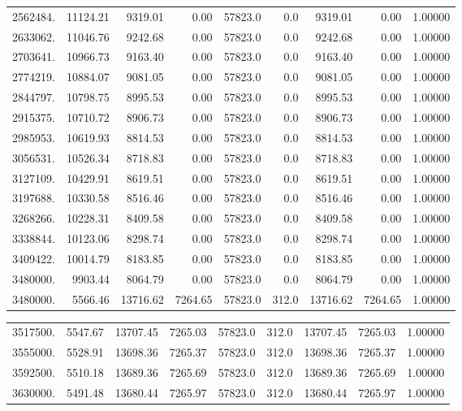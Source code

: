 {\begin{tabular}{rrrrrrrrr}
2562484.& 11124.21 & 9319.01    & 0.00 & 57823.0     & 0.0 & 9319.01    & 0.00 & 1.00000 \\
2633062.& 11046.76 & 9242.68    & 0.00 & 57823.0     & 0.0 & 9242.68    & 0.00 & 1.00000 \\
2703641.& 10966.73 & 9163.40    & 0.00 & 57823.0     & 0.0 & 9163.40    & 0.00 & 1.00000 \\
2774219.& 10884.07 & 9081.05    & 0.00 & 57823.0     & 0.0 & 9081.05    & 0.00 & 1.00000 \\
2844797.& 10798.75 & 8995.53    & 0.00 & 57823.0     & 0.0 & 8995.53    & 0.00 & 1.00000 \\
2915375.& 10710.72 & 8906.73    & 0.00 & 57823.0     & 0.0 & 8906.73    & 0.00 & 1.00000 \\
2985953.& 10619.93 & 8814.53    & 0.00 & 57823.0     & 0.0 & 8814.53    & 0.00 & 1.00000 \\
3056531.& 10526.34 & 8718.83    & 0.00 & 57823.0     & 0.0 & 8718.83    & 0.00 & 1.00000 \\
3127109.& 10429.91 & 8619.51    & 0.00 & 57823.0     & 0.0 & 8619.51    & 0.00 & 1.00000 \\
3197688.& 10330.58 & 8516.46    & 0.00 & 57823.0     & 0.0 & 8516.46    & 0.00 & 1.00000 \\
3268266.& 10228.31 & 8409.58    & 0.00 & 57823.0     & 0.0 & 8409.58    & 0.00 & 1.00000 \\
3338844.& 10123.06 & 8298.74    & 0.00 & 57823.0     & 0.0 & 8298.74    & 0.00 & 1.00000 \\
3409422.& 10014.79 & 8183.85    & 0.00 & 57823.0     & 0.0 & 8183.85    & 0.00 & 1.00000 \\
3480000. & 9903.44 & 8064.79    & 0.00 & 57823.0     & 0.0 & 8064.79    & 0.00 & 1.00000 \\
3480000. & 5566.46& 13716.62 & 7264.65 & 57823.0   & 312.0& 13716.62 & 7264.65 & 1.00000 \\
\end{tabular}
\newpage
\begin{tabular}{rrrrrrrrr} \\
3517500. & 5547.67& 13707.45 & 7265.03 & 57823.0   & 312.0& 13707.45 & 7265.03 & 1.00000 \\
3555000. & 5528.91& 13698.36 & 7265.37 & 57823.0   & 312.0& 13698.36 & 7265.37 & 1.00000 \\
3592500. & 5510.18& 13689.36 & 7265.69 & 57823.0   & 312.0& 13689.36 & 7265.69 & 1.00000 \\
3630000. & 5491.48& 13680.44 & 7265.97 & 57823.0   & 312.0& 13680.44 & 7265.97 & 1.00000 \\

\end{tabular}}

